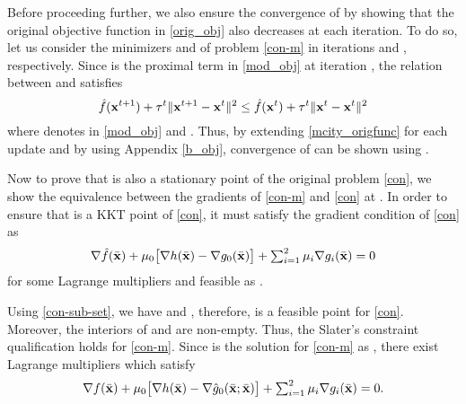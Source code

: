 Before proceeding further, we also ensure the convergence of  by showing that the original objective function in \eqref{orig_obj} also decreases at each iteration. To do so, let us consider the minimizers  and  of problem \eqref{con-m} in iterations  and , respectively. Since  is the proximal term in \eqref{mod_obj} at iteration , the relation between  and  satisfies
\begin{equation} \label{mcity_origfunc}
\hat{f}(\mat{t+1}) + \tau^t \|\mat{t+1} - \mat{t} \|^2 \leq \hat{f}(\mat{t}) + \tau^t \|\mat{t} - \mat{t} \|^2
\end{equation}
where  denotes  in \eqref{mod_obj} and . Thus, by extending \eqref{mcity_origfunc} for each update and by using Appendix \ref{b_obj}, convergence of  can be shown using \cite[Prop. A.3]{bertsekas1999nonlinear}.
	
Now to prove that \eqn{\bar{\ma}} is also a stationary point of the original problem \eqref{con}, we show the equivalence between the gradients of \eqref{con-m} and \eqref{con} at \eqn{\bar{\ma}}. In order to ensure that \eqn{\bar{\ma}} is a \ac{KKT} point of \eqref{con}, it must satisfy the gradient condition of \eqref{con} as
\begin{equation} \label{kkt_expr}
\textstyle	\nabla \hat{f}(\bar{\ma}) + \mu_0 \big [ \nabla h(\bar{\ma}) - \nabla {g}_0(\bar{\ma}) \big ] + \sum_{i=1}^2 \mu_i \nabla g_i(\bar{\ma}) = 0
\end{equation}
for some Lagrange multipliers  and feasible as .

Using \eqref{con-sub-set}, we have  and , therefore, \eqn{\bar{\ma}} is a feasible point for \eqref{con}. Moreover, the interiors of  and  are non-empty. Thus, the Slater's constraint qualification holds for \eqref{con-m}. Since \eqn{\bar{\ma}} is the solution for \eqref{con-m} as , there exist Lagrange multipliers  which satisfy
\begin{equation} \label{kkt_mod_expr}
\textstyle \nabla f(\bar{\ma}) + \mu_0 \big [ \nabla h(\bar{\ma}) - \nabla\hat{g}_0(\bar{\ma};\bar{\ma}) \big ] + \sum_{i=1}^2 \mu_i \nabla g_i(\bar{\ma}) = 0.
\end{equation}

